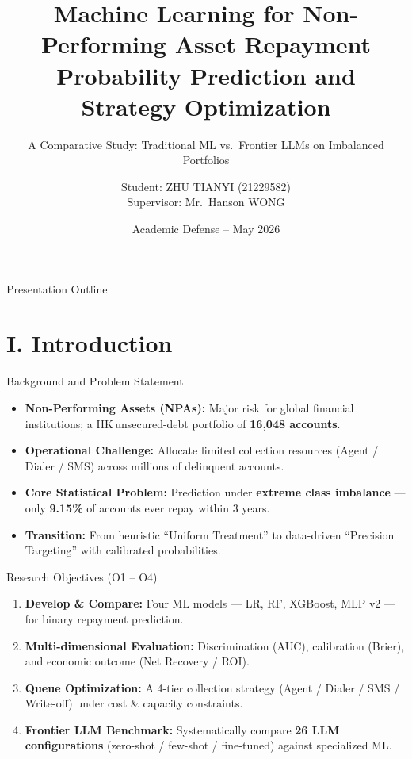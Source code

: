\documentclass[10pt]{beamer}
\title[ML for NPA Repayment Prediction]{\textrm{\textbf{Machine Learning for Non-Performing Asset Repayment Probability Prediction and Strategy Optimization}}}
\subtitle{\textrm{A Comparative Study: Traditional ML vs.\ Frontier LLMs on Imbalanced Portfolios}}
\author[ZHU TIANYI]{\textrm{Student: ZHU TIANYI (21229582)\\[0.5ex] Supervisor: Mr.\ Hanson WONG}}
\institute[HKUST]{\textrm{The Hong Kong University of Science and Technology}}
\date[May 2026]{\textrm{Academic Defense -- May 2026}}
\begin{document}
\frame{\titlepage}

\begin{frame}{\textrm{Presentation Outline}}
\tableofcontents[hideallsubsections]
\end{frame}

\section{I. Introduction}

\begin{frame}{\textrm{Background and Problem Statement}}
    \begin{itemize}
        \item \textbf{Non-Performing Assets (NPAs):} Major risk for global financial institutions; a HK\,unsecured-debt portfolio of \textbf{16{,}048 accounts}.
        \item \textbf{Operational Challenge:} Allocate limited collection resources (Agent / Dialer / SMS) across millions of delinquent accounts.
        \item \textbf{Core Statistical Problem:} Prediction under \textbf{extreme class imbalance} --- only \textbf{9.15\%} of accounts ever repay within 3 years.
        \item \textbf{Transition:} From heuristic ``Uniform Treatment'' to data-driven ``Precision Targeting'' with calibrated probabilities.
    \end{itemize}
\end{frame}

\begin{frame}{\textrm{Research Objectives (O1 -- O4)}}
    \begin{enumerate}
        \item \textbf{Develop \& Compare:} Four ML models --- LR, RF, XGBoost, MLP v2 --- for binary repayment prediction.
        \item \textbf{Multi-dimensional Evaluation:} Discrimination (AUC), calibration (Brier), and economic outcome (Net Recovery / ROI).
        \item \textbf{Queue Optimization:} A 4-tier collection strategy (Agent / Dialer / SMS / Write-off) under cost \& capacity constraints.
        \item \textbf{Frontier LLM Benchmark:} Systematically compare \textbf{26 LLM configurations} (zero-shot / few-shot / fine-tuned) against specialized ML.
    \end{enumerate}
\end{frame}
\end{document}
